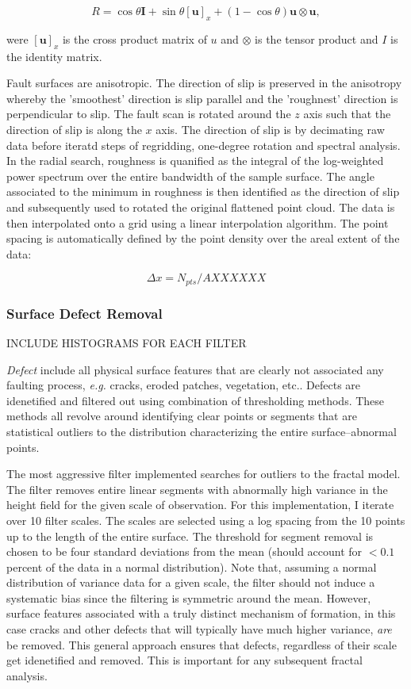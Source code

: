 \documentclass[12pt,a4paper]{article}
\begin{document}
$$ R = \cos\theta\textbf{I} + \sin\theta[\textbf{u}]_x+(1-\cos\theta)\textbf{u}\otimes\textbf{u},$$

were $[\textbf{u}]_x$ is the cross product matrix of $u$ and $\otimes$ is the tensor product and $I$ is the identity matrix.

Fault surfaces are anisotropic. The direction of slip is preserved in the anisotropy whereby the 'smoothest' direction is slip parallel and the 'roughnest' direction is perpendicular to slip. The fault scan is rotated around the $z$ axis such that the direction of slip is along the $x$ axis. The direction of slip is by decimating raw data before iteratd steps of regridding, one-degree rotation and spectral analysis. In the radial search, roughness is quanified as the integral of the log-weighted power spectrum over the entire bandwidth of the sample surface. The angle associated to the minimum in roughness is then identified as the direction of slip and subsequently used to rotated the original flattened point cloud. The data is then interpolated onto a grid using a linear interpolation algorithm. The point spacing is automatically defined by the point density over the areal extent of the data:

\begin{equation}
	\Delta x = N_{pts}/A XXXXXX
\end{equation}

		\subsubsection{Surface Defect Removal} 

INCLUDE HISTOGRAMS FOR EACH FILTER


\textit{Defect} include all physical surface features that are clearly not associated any faulting process, \textit{e.g.} cracks, eroded patches, vegetation, etc.. Defects are idenetified and filtered out using combination of thresholding methods. These methods all revolve around identifying clear points or segments that are statistical outliers to the distribution characterizing the entire surface--abnormal points. 

The most aggressive filter implemented searches for outliers to the fractal model. The filter removes entire linear segments with abnormally high variance in the height field for the given scale of observation. For this implementation, I iterate over 10 filter scales. The scales are selected using a log spacing from the 10 points up to the length of the entire surface. The threshold for segment removal is chosen to be four standard deviations from the mean (should account for $<0.1$ percent of the data in a normal distribution). Note that, assuming a normal distribution of variance data for a given scale, the filter should not induce a systematic bias since the filtering is symmetric around the mean. However, surface features associated with a truly distinct mechanism of formation, in this case cracks and other defects that will typically have much higher variance, \textit{are} be removed. This general approach ensures that defects, regardless of their scale get idenetified and removed. This is important for any subsequent fractal analysis.
\end{document}
